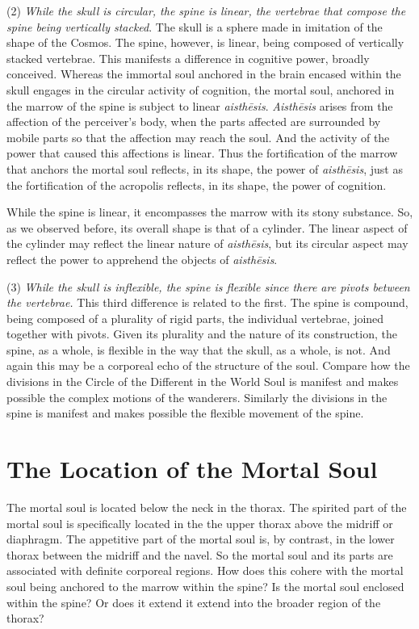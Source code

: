 (2) \emph{While the skull is circular, the spine is linear, the vertebrae that compose the spine being vertically stacked}. The skull is a sphere made in imitation of the shape of the Cosmos. The spine, however, is linear, being composed of vertically stacked vertebrae. This manifests a difference in cognitive power, broadly conceived. Whereas the immortal soul anchored in the brain encased within the skull engages in the circular activity of cognition, the mortal soul, anchored in the marrow of the spine is subject to linear \emph{aisthēsis}. \emph{Aisthēsis} arises from the affection of the perceiver's body, when the parts affected are surrounded by mobile parts so that the affection may reach the soul. And the activity of the power that caused this affections is linear. Thus the fortification of the marrow that anchors the mortal soul reflects, in its shape, the power of \emph{aisthēsis}, just as the fortification of the acropolis reflects, in its shape, the power of cognition.

While the spine is linear, it encompasses the marrow with its stony substance. So, as we observed before, its overall shape is that of a cylinder. The linear aspect of the cylinder may reflect the linear nature of \emph{aisthēsis}, but its circular aspect may reflect the power to apprehend the objects of \emph{aisthēsis}.

(3) \emph{While the skull is inflexible, the spine is flexible since there are pivots between the vertebrae.} This third difference is related to the first. The spine is compound, being composed of a plurality of rigid parts, the individual vertebrae, joined together with pivots. Given its plurality and the nature of its construction, the spine, as a whole, is flexible in the way that the skull, as a whole, is not. And again this may be a corporeal echo of the structure of the soul. Compare how the divisions in the Circle of the Different in the World Soul is manifest and makes possible the complex motions of the wanderers. Similarly the divisions in the spine is manifest and makes possible the flexible movement of the spine. 



\section{The Location of the Mortal Soul} %
\label{sec:the_location_of_the_mortal_soul}

The mortal soul is located below the neck in the thorax. The spirited part of the mortal soul is specifically located in the the upper thorax above the midriff or diaphragm. The appetitive part of the mortal soul is, by contrast, in the lower thorax between the midriff and the navel. So the mortal soul and its parts are associated with definite corporeal regions. How does this cohere with the mortal soul being anchored to the marrow within the spine? Is the mortal soul enclosed within the spine? Or does it extend it extend into the broader region of the thorax?

